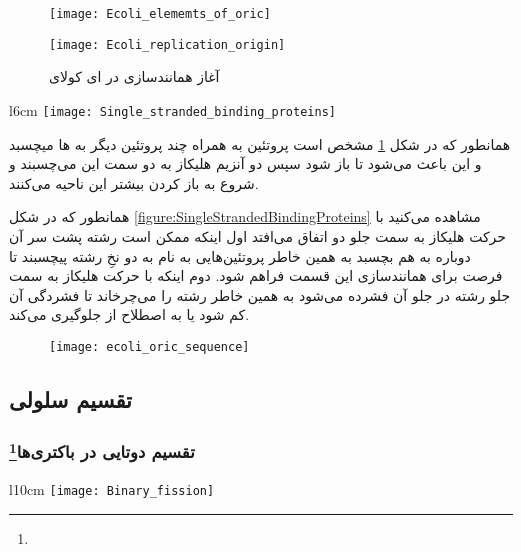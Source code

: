 \begin{figure}[htbp]
	\centering
	\texttt{[image: Ecoli\_elememts\_of\_oric]}
\end{figure}

\begin{figure}[htbp]
	\centering
	\texttt{[image: Ecoli\_replication\_origin]}
	\caption{آغاز همانندسازی در ای کولای}
	\label{figure:ecoliInitialReproduction}
\end{figure}

\begin{wrapfigure}{l}{6cm}
	\centering
	\texttt{[image: Single\_stranded\_binding\_proteins]}
	\caption{}
	\label{figure:SingleStrandedBindingProteins}
\end{wrapfigure}

همانطور که در شکل
\ref{figure:ecoliInitialReproduction}
مشخص است پروتئین
به همراه چند پروتئین دیگر
به
ها میچسبد و این باعث می‌شود تا
باز شود سپس دو آنزیم هلیکاز به دو سمت این
می‌چسبند و شروع به باز کردن بیشتر این ناحیه می‌کنند.

همانطور که در شکل
\ref{figure:SingleStrandedBindingProteins}
مشاهده می‌کنید با حرکت هلیکاز به سمت جلو دو اتفاق می‌افتد اول اینکه ممکن است رشته پشت سر آن دوباره به هم بچسبد به همین خاطر پروتئین‌هایی به نام
به دو نخِ رشته
پیچسبند تا فرصت برای همانندسازی این قسمت فراهم شود. دوم اینکه با حرکت هلیکاز به سمت جلو رشته
در جلو آن فشرده می‌شود به همین خاطر
رشته
را می‌چرخاند تا فشردگی آن کم شود یا به اصطلاح از
جلوگیری می‌کند.

\begin{figure}[htbp]
	\centering
	\texttt{[image: ecoli\_oric\_sequence]}
\end{figure}

\pagebreak
\subsection{تقسیم سلولی}
\subsubsection{تقسیم دوتایی در باکتری‌ها\protect\footnote{}}

\begin{wrapfigure}[15]{l}{10cm}
	\centering
	\texttt{[image: Binary\_fission]}
\end{wrapfigure}

